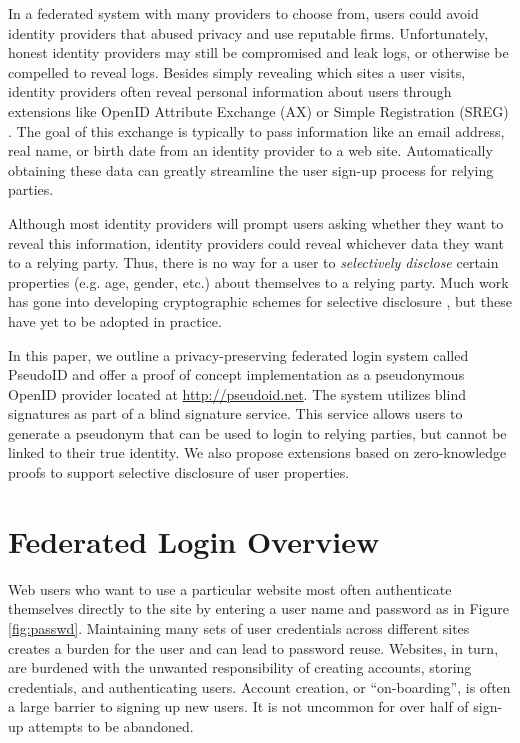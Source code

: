\documentclass[11pt]{llncs}
\begin{document}
In a federated system with many providers to choose from, users could
avoid identity providers that abused privacy and use reputable
firms. Unfortunately, honest identity providers may still be
compromised and leak logs, or otherwise be compelled to reveal
logs. Besides simply revealing which sites a user visits, identity
providers often reveal personal information about users through
extensions like OpenID Attribute Exchange (AX) \cite{AX} or Simple
Registration (SREG) \cite{Sreg}. The goal of this exchange is
typically to pass information like an email address, real name, or
birth date from an identity provider to a web site. Automatically
obtaining these data can greatly streamline the user sign-up process
for relying parties.

Although most identity providers will prompt users asking whether they
want to reveal this information, identity providers could reveal whichever
data they want to a relying party. Thus, there is no way for a user to
\emph{selectively disclose} certain properties (e.g. age, gender,
etc.) about themselves to a relying party. Much work has gone into
developing cryptographic schemes for selective disclosure
\cite{CaLy01,CaLy04,CHL05,CaGr08}, but these have yet to be adopted in
practice.

In this paper, we outline a privacy-preserving federated login system
called PseudoID and offer a proof of concept implementation as a
pseudonymous OpenID provider located at \url{http://pseudoid.net}. The
system utilizes blind signatures \cite{Cha82} as part of a blind
signature service. This service allows users to generate a pseudonym
that can be used to login to relying parties, but cannot be linked to
their true identity. We also propose extensions based on
zero-knowledge proofs \cite{GMR89} to support selective disclosure of
user properties.

\section{Federated Login Overview}
\label{sec:fedlogin}

Web users who want to use a particular website most often authenticate
themselves directly to the site by entering a user name and password as
in Figure \ref{fig:passwd}. Maintaining many sets of user credentials
across different sites creates a burden for the user and can lead to
password reuse. Websites, in turn, are burdened with the unwanted
responsibility of creating accounts,
storing credentials, and authenticating users. Account creation, or
``on-boarding'', is often a large barrier to signing up new users. It
is not uncommon for over half of sign-up attempts to be abandoned.
\end{document}
